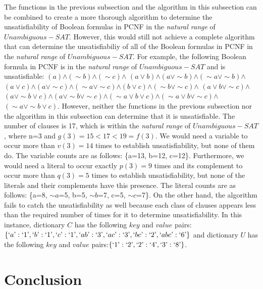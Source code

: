 \documentclass[runningheads,a4paper]{llncs}
\let\oldsim\sim
\renewcommand{\sim}{{\oldsim}}
\begin{document}
The functions in the previous subsection and the algorithm in this subsection can be combined to create a more thorough algorithm to determine the unsatisfiability of Boolean formulas in PCNF in the \emph{natural range} of ${Unambiguous-SAT}$. However, this would still not achieve a complete algorithm that can determine the unsatisfiabiliy of all of the Boolean formulas in PCNF in the \emph{natural range} of ${Unambiguous-SAT}$. For example, the following Boolean formula in PCNF is in the \emph{natural range} of ${Unambiguous-SAT}$ and is unsatisfiable: $({a})$$\wedge$$(\sim{b})$$\wedge$$(\sim{c})$$\wedge$ $({a}\vee {b})$$\wedge$$({a}\vee \sim {b})$$\wedge$$(\sim {a}\vee \sim {b})$$\wedge$$({a}\vee {c})$$\wedge$$({a}\vee \sim {c})$$\wedge$$(\sim {a}\vee \sim {c})$$\wedge$$({b}\vee {c})$$\wedge$$(\sim {b}\vee \sim {c})$$\wedge$ $({a}\vee {b} \vee \sim {c})$$\wedge$$({a}\vee \sim {b} \vee {c})$$\wedge$$({a}\vee \sim {b} \vee \sim {c})$$\wedge$$(\sim {a}\vee {b} \vee {c})$$\wedge$$(\sim {a}\vee {b} \vee \sim {c})$$\wedge$$( \sim {a}\vee \sim {b} \vee {c})$. However, neither the functions in the previous subsection nor the algorithm in this subsection can determine that it is unsatisfiable. The number of clauses is 17, which is within the \emph{natural range} of ${Unambiguous-SAT}$, where n=3 and $g(3)=15<17<19=f(3)$. We would need a variable to occur more than $v(3)=14$ times to establish unsatisfiability, but none of them do. The variable counts are as follows: \{a=13, b=12, c=12\}. Furthermore, we would need a literal to occur exactly $p(3)=9$ times and its complement to occur more than $q(3)=5$ times to establish unsatisfiability, but none of the literals and their complements have this presence. The literal counts are as follows: \{a=8, $\sim{a}$=5, b=5, $\sim{b}$=7, c=5, $\sim{c}$=7\}. On the other hand, the algorithm fails to catch the unsatisfiability as well because each class of clauses appears less than the required number of times for it to determine unsatisfiability. In this instance, dictionary $C$ has the following $key$ and $value$ pairs:$ \{`a\textrm':`1\textrm',`b\textrm':`1\textrm',`c\textrm':`1\textrm',`ab\textrm':`3\textrm', `ac\textrm':`3\textrm', `bc\textrm':`2\textrm', `abc\textrm':`6\textrm'\}$ and dictionary $U$ has the following $key$ and $value$ pairs:$\{`1\textrm':`2\textrm',`2\textrm':`4\textrm',`3\textrm':`8\textrm'\}$.


\section{Conclusion}
\end{document}
